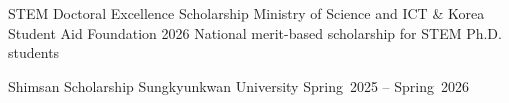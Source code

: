 \begin{cventries}
  \cventry
    {STEM Doctoral Excellence Scholarship}
    {Ministry of Science and ICT \& Korea Student Aid Foundation}
    {2026}
    {}
    {National merit-based scholarship for STEM Ph.D. students}

  \cventry
    {Shimsan Scholarship}
    {Sungkyunkwan University}
    {Spring~2025 – Spring~2026}
    {}
    {}
\end{cventries}

